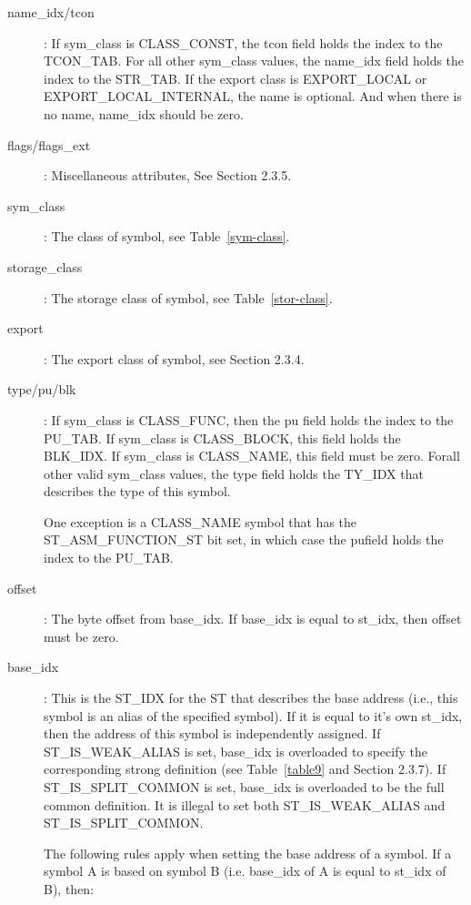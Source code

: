 \begin{description}
\item[name\_idx/tcon]: If sym\_class is CLASS\_CONST, the tcon field
  holds the index to the TCON\_TAB. For all other sym\_class values,
  the name\_idx field holds the index to the STR\_TAB. If the export
class is
%
EXPORT\_LOCAL or EXPORT\_LOCAL\_INTERNAL, the name is
  optional. And when there is no name, name\_idx should be zero.

\item[flags/flags\_ext]: Miscellaneous attributes, See Section
  2.3.5. 
\item[sym\_class]: The class of symbol, see
  Table~\ref{sym-class}. 
\item[storage\_class]: The storage class of symbol,
  see Table~\ref{stor-class}. 
\item[export]: The export class of symbol, see Section
  2.3.4. 
\item[type/pu/blk]: If sym\_class is CLASS\_FUNC, then the pu field
  holds the index to the PU\_TAB. If sym\_class is CLASS\_BLOCK, this
  field holds the BLK\_IDX. If sym\_class is CLASS\_NAME, this field
  must be zero. Forall other valid sym\_class values, the type field
holds the
%
TY\_IDX that describes the type of this symbol.

One exception is a
%
CLASS\_NAME symbol that has the
%
ST\_ASM\_FUNCTION\_ST bit set, in which case the pufield holds the index to the
PU\_TAB.

\item[offset]: The byte offset from base\_idx. If base\_idx is equal to
st\_idx, then offset must be zero.

\item[base\_idx]: This is the
%
ST\_IDX for the
%
ST that describes the
  base address (i.e., this symbol is an alias of the specified
  symbol).  If it is equal to it's own st\_idx, then the address of
this symbol is independently assigned. If
%
ST\_IS\_WEAK\_ALIAS is
  set, base\_idx is overloaded to specify the corresponding strong
  definition (see Table~\ref{table9} and Section 2.3.7). If
%
  ST\_IS\_SPLIT\_COMMON is set, base\_idx is overloaded to be the full
common definition. It is illegal to set both
%
ST\_IS\_WEAK\_ALIAS
  and ST\_IS\_SPLIT\_COMMON.

The following rules apply when setting the base address of a symbol. If a symbol
A is based on symbol B (i.e. base\_idx of A is equal to st\_idx of B), then:


\end{description}
